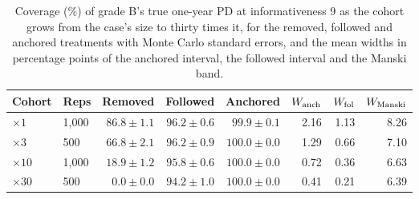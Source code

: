 \begin{table}[htbp]
\centering
\footnotesize
\caption{Coverage (\%) of grade B's true one-year PD at informativeness 9 as the cohort grows from the case's size to thirty times it, for the removed, followed and anchored treatments with Monte Carlo standard errors, and the mean widths in percentage points of the anchored interval, the followed interval and the Manski band.}
\label{tab:scale}
\begin{tabular}{llrrrrrr}
\toprule
Cohort & Reps & Removed & Followed & Anchored & $W_{\rm anch}$ & $W_{\rm fol}$ & $W_{\rm Manski}$ \\
\midrule
$\times1$ & 1,000 & $86.8\pm1.1$ & $96.2\pm0.6$ & $99.9\pm0.1$ & 2.16 & 1.13 & 8.26 \\
$\times3$ & 500 & $66.8\pm2.1$ & $96.2\pm0.9$ & $100.0\pm0.0$ & 1.29 & 0.66 & 7.10 \\
$\times10$ & 1,000 & $18.9\pm1.2$ & $95.8\pm0.6$ & $100.0\pm0.0$ & 0.72 & 0.36 & 6.63 \\
$\times30$ & 500 & $0.0\pm0.0$ & $94.2\pm1.0$ & $100.0\pm0.0$ & 0.41 & 0.21 & 6.39 \\
\bottomrule
\end{tabular}
\end{table}
